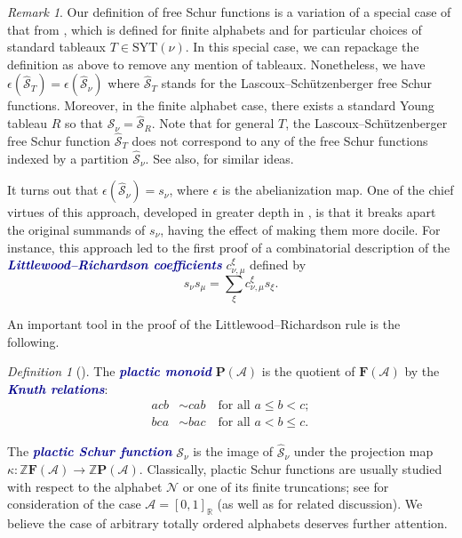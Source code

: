 \documentclass[12 pt]{amsart}
\newcommand{\newword}[1]{\textcolor{darkblue}{\textbf{\emph{#1}}}}
\newcommand{\Z}{\mathbb{Z}}
\newcommand{\Plactic}{{\mathbf{P}}}
\newcommand{\Free}{\mathbf{F}}
\newcommand{\PlacticSchur}{\mathcal{S}}
\newcommand{\FreeSchur}{\widehat{\mathcal{S}}}
\newcommand{\cA}{\mathcal{A}}
\newcommand{\cN}{\mathcal{N}}
\newcommand{\SYT}{\mathrm{SYT}}
\theoremstyle{remark}
\newtheorem{definition}[thm]{Definition}
\newtheorem{remark}[thm]{Remark}
\numberwithin{equation}{section}
\begin{document}
\begin{remark}
    Our definition of free Schur functions is a variation of a special case of that from \cite{Lascoux.Schutzenberger:plaxique}, which is defined for finite alphabets and for particular choices of standard tableaux $T \in \SYT(\nu)$. In this special case, we can repackage the definition as above to remove any mention of tableaux. Nonetheless, we have 
    $\epsilon(\FreeSchur_T) = \epsilon(\FreeSchur_{\nu})$
    where $\FreeSchur_T$ stands for the Lascoux--Sch\"utzenberger free Schur functions. 
    Moreover, in the finite alphabet case, there exists a standard Young tableau $R$ so that 
    $\FreeSchur_\nu = \FreeSchur_R.$
    Note that for general $T$, the Lascoux--Sch\"{u}tzenberger free Schur function $\FreeSchur_T$ does not correspond to any of the free Schur functions indexed by a partition $\FreeSchur_\nu$. See also, \cite{Fomin.Greene} for similar ideas.
\end{remark}

It turns out that $\epsilon(\FreeSchur_\nu) = s_\nu$, where $\epsilon$ is the abelianization map. One of the chief virtues of this approach, developed in greater depth in \cite{Lascoux.Schutzenberger:plaxique,Schutzenberger:pourleplaxique,Lothaire}, is that it breaks apart the original summands of $s_\nu$, having the effect of making them more docile. For instance, this approach led to the first proof of a combinatorial description of the \newword{Littlewood--Richardson coefficients} $c_{\nu,\mu}^\xi$ defined by
$$s_\nu s_\mu=\sum_{\xi} c_{\nu,\mu}^\xi s_\xi.$$ 



An important tool in the proof of the Littlewood--Richardson rule is the following.
\begin{definition}[\cite{Knuth,Lascoux.Schutzenberger:plaxique}]\label{def:Knuth}
    The \newword{plactic monoid} $\Plactic(\cA)$ is the quotient of $\Free(\cA)$ by the \newword{Knuth relations}:
    \begin{align}
    acb &\sim cab \quad\text{for all } a\leq b < c;  \tag{K.1}\label{eq:P1}\\
      bca &\sim bac \quad \text{for all } a< b \leq c.  \tag{K.2}\label{eq:P2} 
    \end{align}
\end{definition}
The \newword{plactic Schur function} $\PlacticSchur_\nu$ is the image of $\FreeSchur_\nu$ under the projection map $\kappa : \Z\Free(\cA) \to \Z\Plactic(\cA)$. Classically, plactic Schur functions are usually studied with respect to the alphabet $\cN$ or one of its finite truncations; see \cite{Romik.Sniady:jdt} for consideration of the case $\cA = [0,1]_\mathbb{R}$ (as well as \cite{Romik.Sniady:bumping} for related discussion). We believe the case of arbitrary totally ordered alphabets deserves further attention.
\end{document}
